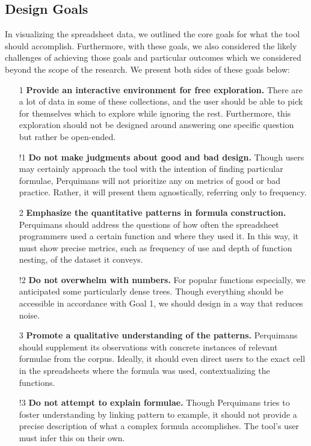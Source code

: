 \documentclass[conference]{IEEEtran}
\newcommand{\toolname}{Perquimans }
\begin{document}
	\subsection{Design Goals} \label{goals} In visualizing the spreadsheet data, we
	outlined the core goals for what the tool should accomplish. Furthermore, with
	these goals, we also considered the likely challenges of achieving those goals
	and particular outcomes which we considered beyond the scope of the research.
	We present both sides of these goals below:
	
	\begin{itemize}
		
		\item [1] \textbf{Provide an interactive environment for free exploration.}
		There are a lot of data in some of these collections, and the user should be
		able to pick for themselves which to explore while ignoring the rest.
		Furthermore, this exploration should not be designed around answering one
		specific question but rather be open-ended.
		
		\item [!1] \textbf{Do not make judgments about good and bad design.} Though
		users may certainly approach the tool with the intention of finding particular
		formulae, \toolname will not prioritize any on metrics of good or bad
		practice. Rather, it will present them agnostically, referring only to
		frequency.
		
		\item [2] \textbf{Emphasize the quantitative patterns in formula
			construction.} \toolname should address the questions of how often the
		spreadsheet programmers used a certain function and where they used it. In
		this way, it must show precise metrics, such as frequency of use and depth of
		function nesting, of the dataset it conveys.
		
		\item [!2] \textbf{Do not overwhelm with numbers.} For popular functions
		especially, we anticipated some particularly dense trees. Though everything
		should be accessible in accordance with Goal 1, we should design in a way that
		reduces noise.
		
		\item [3] \textbf{Promote a qualitative understanding of the patterns.}
		\toolname should supplement its observations with concrete instances of
		relevant formulae from the corpus. Ideally, it should even direct users to the
		exact cell in the spreadsheets where the formula was used, contextualizing the
		functions.
		
		\item [!3] \textbf{Do not attempt to explain formulae.} Though \toolname tries
		to foster understanding by linking pattern to example, it should not provide a
		precise description of what a complex formula accomplishes. The tool's user
		must infer this on their own.
		
	\end{itemize}
	
\end{document}
